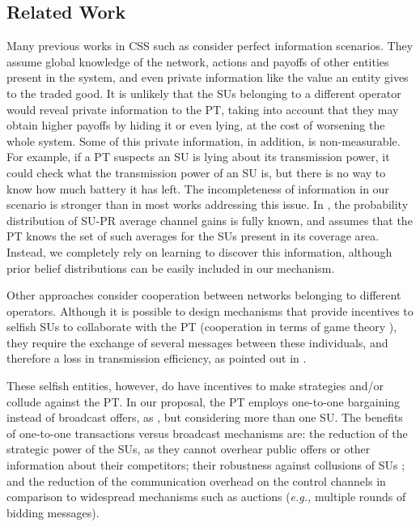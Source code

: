 \subsection{Related Work}\label{sec:Rel}
Many previous works in CSS such as \cite{ref:Simeone2008,ref:Zhang2009,ref:Yi2010,ref:Nadkar2011} consider perfect information scenarios. 
They assume global knowledge of the network, actions and payoffs of other entities present in the system, and even private information like the value an entity gives to the traded good.
It is unlikely that the SUs belonging to a different operator would reveal private information to the PT, taking into account that they may obtain higher payoffs by hiding it or even lying, at the cost of worsening the whole system. 
Some of this private information, in addition, is non-measurable. For example, if a PT suspects an SU is lying about its transmission power, it could check what the transmission power of an SU is, but there is no way to know how much battery it has left.
The incompleteness of information in our scenario is stronger than in most works addressing this issue. In \cite{ref:Duan2014}, the probability distribution of SU-PR average channel gains is fully known, and \cite{ref:Feng2014} assumes that the PT knows the set of such averages for the SUs present in its coverage area. Instead, we completely rely on learning to discover this information, although prior belief distributions can be easily included in our mechanism. 

Other approaches \cite{ref:Yuan2013,ref:Han2010,ref:Li2011} consider cooperation between networks belonging to different operators. 
Although it is possible to design mechanisms that provide incentives to selfish SUs to collaborate with the PT (cooperation in terms of game theory \cite{ref:Zhang2012_Fair}), they require the exchange of several messages between these individuals, and therefore a loss in transmission efficiency, as pointed out in \cite{ref:Niyato2008_Mark}.

These selfish entities, however, do have incentives to make strategies and/or collude against the PT. 
In our proposal, the PT employs one-to-one bargaining instead of broadcast offers, as \cite{ref:Yan2013}, but considering more than one SU. The benefits of one-to-one transactions versus broadcast mechanisms \cite{ref:Feng2014,ref:Duan2014,ref:Jayaweera2011,ref:Zhang2009,ref:Simeone2008} are: the reduction of the strategic power of the SUs, as they cannot overhear public offers or other information about their competitors; their robustness against collusions of SUs \cite{ref:Alcaraz2014}; and the reduction of the communication overhead on the control channels in comparison to widespread mechanisms such as auctions \cite{ref:Feng2014, ref:Jayaweera2011} (\textit{e.g.,} multiple rounds of bidding messages).
 

